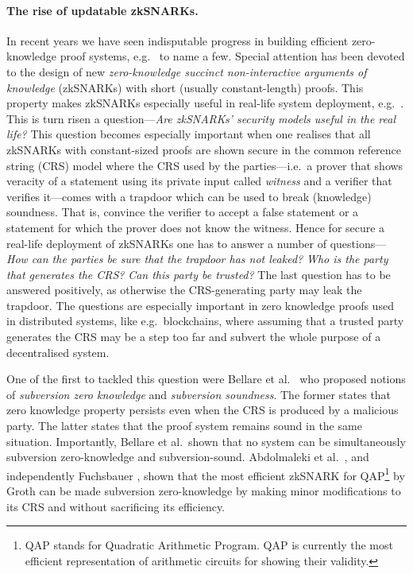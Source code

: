 \let\accentvec\vec \documentclass[runningheads]{llncs}
\begin{document}
\paragraph{The rise of updatable
zkSNARKs.} 
In recent years we have seen indisputable progress in building efficient zero-knowledge
proof systems,
e.g.~\cite{AC:Groth10a,TCC:Lipmaa12,EC:GGPR13,SP:PHGR13,AC:Lipmaa13,AC:DFGK14,EC:Groth16,SP:BBBPWM18}
to name a few. Special attention has been devoted to the design of new
\emph{zero-knowledge succinct non-interactive arguments of knowledge} (zkSNARKs) with short (usually constant-length) proofs.
This property makes zkSNARKs especially useful in real-life system deployment,
e.g.~\cite{REPO:Zcash20,ARXIV:RonZaj19,REPO:Zeth20,REPO:Celo20,REPO:Aztec20}.
This is turn risen a question---\emph{Are zkSNARKs' security models useful in
the real life?} This question becomes especially important when one realises that all
zkSNARKs with constant-sized proofs are shown secure in the common
reference string (CRS) model where the CRS used by the parties---i.e.~a prover
that shows veracity of a statement using its private input called
\emph{witness} and a verifier that verifies it---comes with a trapdoor which
can be used to break (knowledge) soundness. That is, convince the verifier to
accept a false statement or a statement for which the prover does not
know the witness. Hence for secure a real-life deployment of zkSNARKs one has
to answer a number of questions---\emph{How can the parties be sure that the
trapdoor has not leaked?} \emph{Who is the party that generates the CRS?}
\emph{Can this party be trusted?} The last question has to be answered
positively, as otherwise the CRS-generating party may leak the trapdoor. The
questions are especially important in zero knowledge proofs used in
distributed systems, like e.g.~blockchains, where assuming that a trusted
party generates the CRS may be a step too far and subvert the whole purpose of
a decentralised system. 

One of the first to tackled this question were Bellare et al.~\cite{AC:BelFucSca16} who
proposed notions of \emph{subversion zero knowledge} and \emph{subversion
soundness}. The former states that zero knowledge property persists even when
the CRS is produced by a malicious party. The latter states that the proof
system remains sound in the same situation. Importantly, Bellare et al.~shown
that no system can be simultaneously subversion zero-knowledge and subversion-sound.
Abdolmaleki et al.~\cite{AC:ABLZ17}, and independently Fuchsbauer
\cite{PKC:Fuchsbauer18}, shown that the most
efficient zkSNARK for QAP\footnote{QAP stands for Quadratic Arithmetic
Program. QAP is currently the most efficient representation of arithmetic
circuits for showing their validity.} by Groth \cite{EC:Groth16} can be made
subversion zero-knowledge by making minor modifications to its CRS and without
sacrificing its efficiency. 
\end{document}
